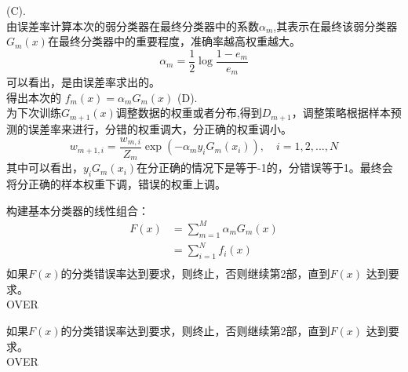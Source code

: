 \documentclass[UTF8]{ctexart}
\begin{document}
\begin{algorithm}[htb]
\begin{algorithmic}[1]
				(C).\\
				由误差率计算本次的弱分类器在最终分类器中的系数$\alpha_m$,其表示在最终该弱分类器$G_m(x)$在最终分类器中的重要程度，准确率越高权重越大。
				$$
				\alpha_m = \frac{1}{2} \log{\frac{1-e_m}{e_m}}
				$$
				可以看出，是由误差率求出的。
				\\
				得出本次的 $f_m(x) = \alpha_m G_m(x)$
				(D).\\
				为下次训练$G_{m+1}(x)$调整数据的权重或者分布,得到$D_{m+1}$，调整策略根据样本预测的误差率来进行，分错的权重调大，分正确的权重调小。
				$$
				w_{m+1,i} =\frac{w_{m,i}}{Z_m}  \exp {(-\alpha_m {y_i G_m(x_i)})},\quad i=1,2,...,N
				$$
				其中可以看出，${y_i G_m(x_i)}$在分正确的情况下是等于-1的，分错误等于1。最终会将分正确的样本权重下调，错误的权重上调。
				
				
				\STATE 构建基本分类器的线性组合：
				$$
				\begin{aligned}
				F(x)  &= \sum_{m=1}^{M} \alpha_m G_m(x)  \\
				&= \sum_{i=1}^{N} f_i(x)    \\
				\end{aligned}
				$$
				如果$F(x)$的分类错误率达到要求，则终止，否则继续第2部，直到$F(x)$ 达到要求。\\
				\STATE OVER
	    	\end{algorithmic}
  \end{algorithm}


\begin{algorithm}[htb]
	\begin{algorithmic}[l]
	\REQUIRE 
	\ENSURE
	\STATE 如果$F(x)$的分类错误率达到要求，则终止，否则继续第2部，直到$F(x)$ 达到要求。\\
\STATE OVER
	\end{algorithmic}
\end{algorithm}
\end{document}
